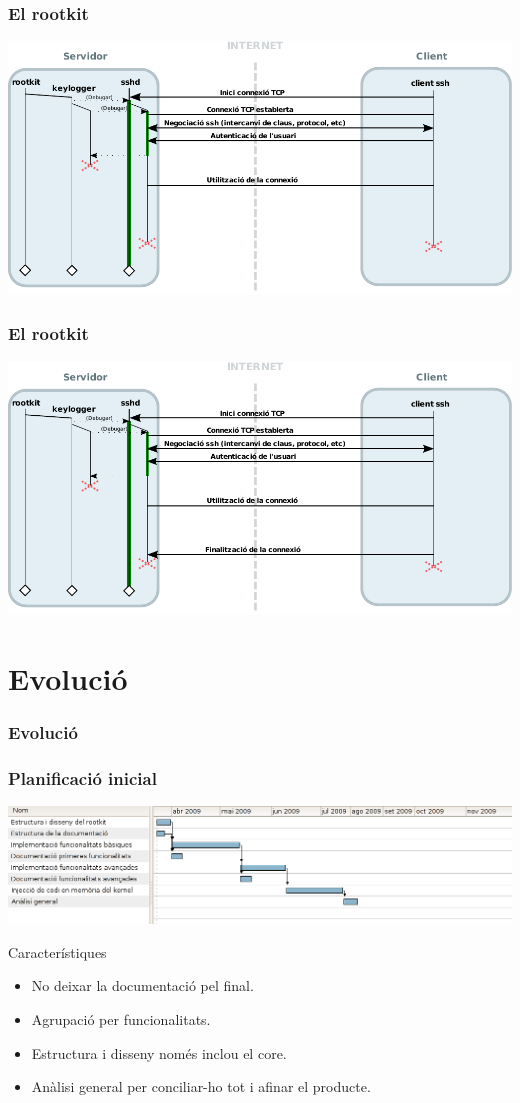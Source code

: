 \documentclass{beamer}
\begin{document}
\begin{frame}
	\frametitle{El rootkit}
	\includegraphics[scale=0.65,keepaspectratio]{sshd_keylogger_10.pdf}
\end{frame}

\begin{frame}
	\frametitle{El rootkit}
	\includegraphics[scale=0.65,keepaspectratio]{sshd_keylogger.pdf}
\end{frame}

\section{Evolució}
\begin{frame}
	\frametitle{Evolució}
\end{frame}

\begin{frame}
	\frametitle{Planificació inicial}
	\hspace*{-0.38in}
	\includegraphics[scale=0.35,keepaspectratio]{gantt1.png} 
	\begin{block}{Característiques}
		\begin{itemize}
			\item No deixar la documentació pel final.
			\item Agrupació per funcionalitats.
			\item Estructura i disseny només inclou el core.
			\item Anàlisi general per conciliar-ho tot i afinar el producte.
		\end{itemize}
	\end{block}
\end{frame}
\end{document}
